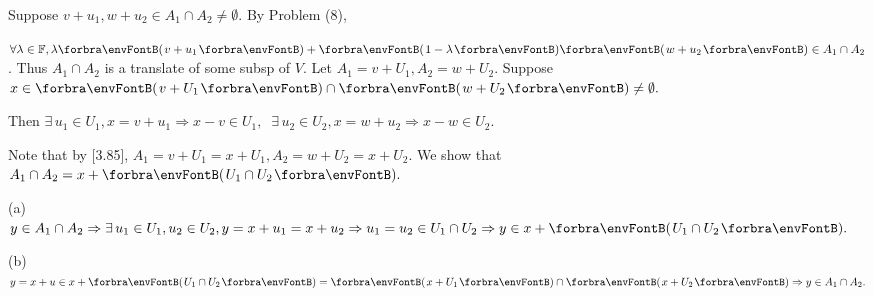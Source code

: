 \documentclass[a4paper, 11pt, UTF8]{article}
\begin{document}
\begin{large}
\par\quad
Suppose $v+u_1,w+u_2\in A_1\cap A_2\neq\emptyset$. By Problem (8),\par\quad
$\forall\lambda\in\Fbb,\lambda\Par{v+u_1}+\Par{1-\lambda}\Par{w+u_2}\in A_1\cap A_2$. Thus $A_1\cap A_2$ is a translate of some subsp of $V.$\PfEnd\vspace{6pt}\quad
\Or Let $A_1=v+U_1,A_2=w+U_2.$ Suppose $x\in \Par{v+U_1}\cap \Par{w+U_2}\neq\emptyset.$\par\quad
Then $\exists\,u_1\in U_1,x=v+u_1\Rightarrow x-v\in U_1,\;\;\exists\,u_2\in U_2,x=w+u_2\Rightarrow x-w\in U_2$.\par\quad
Note that by [3.85], $A_1=v+U_1=x+U_1,A_2=w+U_2=x+U_2.$ We show that $A_1\cap A_2=x+\Par{U_1\cap U_2}.$\vspace{3pt}\par\quad
(a) $y\in A_1\cap A_2\Rightarrow\exists\,u_1\in U_1,u_2\in U_2,y=x+u_1=x+u_2\Rightarrow u_1=u_2\in U_1\cap U_2\Rightarrow y\in x+\Par{U_1\cap U_2}.$\vspace{3pt}\par\quad
(b) $y=x+u\in x+\Par{U_1\cap U_2}=\Par{x+U_1}\cap \Par{x+U_2}\Rightarrow y\in A_1\cap A_2.$\PfEnd
\SepLine


\end{large}
\end{document}
